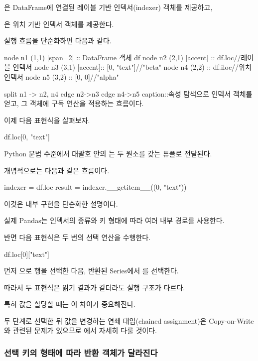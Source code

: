 은 DataFrame에 연결된 레이블 기반 인덱서(indexer) 객체를 제공하고,

은 위치 기반 인덱서 객체를 제공한다.

실행 흐름을 단순화하면 다음과 같다.

\begin{dhkgraph}[uniform]
node n1 (1,1) [span=2] :: DataFrame 객체 df
node n2 (2,1) [accent] :: df.loc//레이블 인덱서
node n3 (3,1) [accent]:: [0, "text"]//"beta"
node n4 (2,2) :: df.iloc//위치 인덱서
node n5 (3,2) :: [0, 0]//"alpha"

split n1 -> n2, n4
edge n2->n3
edge n4->n5
caption::속성 탐색으로 인덱서 객체를 얻고, 그 객체에 구독 연산을 적용하는 흐름이다.
\end{dhkgraph}

이제 다음 표현식을 살펴보자.

\begin{dhkcode}
df.loc[0, "text"]
\end{dhkcode}

Python 문법 수준에서 대괄호 안의 는 두 원소를 갖는 튜플로 전달된다.

개념적으로는 다음과 같은 흐름이다.

\begin{dhkcode}
indexer = df.loc
result = indexer.__getitem__((0, "text"))
\end{dhkcode}

이것은 내부 구현을 단순화한 설명이다.

실제 Pandas는 인덱서의 종류와 키 형태에 따라 여러 내부 경로를 사용한다.

반면 다음 표현식은 두 번의 선택 연산을 수행한다.

\begin{dhkcode}
df.loc[0]["text"]
\end{dhkcode}

먼저 으로 행을 선택한 다음, 반환된 Series에서 를 선택한다.

따라서 두 표현식은 읽기 결과가 같더라도 실행 구조가 다르다.

특히 값을 할당할 때는 이 차이가 중요해진다.

두 단계로 선택한 뒤 값을 변경하는 연쇄 대입(chained assignment)은 Copy-on-Write와 관련된 문제가 있으므로 에서 자세히 다룰 것이다.

\subsubsection{선택 키의 형태에 따라 반환 객체가 달라진다}


